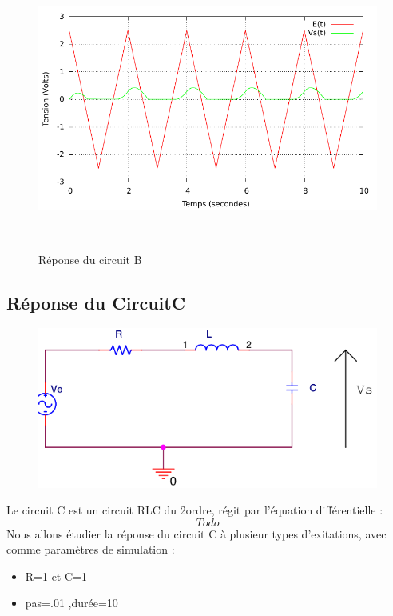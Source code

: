 \documentclass[a4paper,11pt]{article}
\begin{document}
\begin{figure}[h!]
\begin{minipage}[b]{0.5\linewidth}
   \end{minipage}
  \begin{minipage}[b]{0.5\linewidth}   
      \centering \includegraphics[scale=.68]{CBtriangle.pdf}
   \end{minipage}\\
 \caption{ Réponse du circuit B}
\end{figure}
\newpage
  \subsection{Réponse du CircuitC}

  \begin{figure}[H]
	 \begin{center}
	\includegraphics[scale=.5]{circuitC}
	\end{center}
      \end{figure}
   Le circuit C est un circuit RLC du 2\ieme ordre, régit par l'équation différentielle :
   \begin{equation*}
    Todo
   \end{equation*}
  Nous allons étudier la réponse du circuit C à plusieur types d'exitations, avec comme paramètres de simulation :  \\
  \begin{itemize}
   \item R=1 et C=1
      \item pas=.01 ,durée=10 
  \end{itemize}
\end{document}
